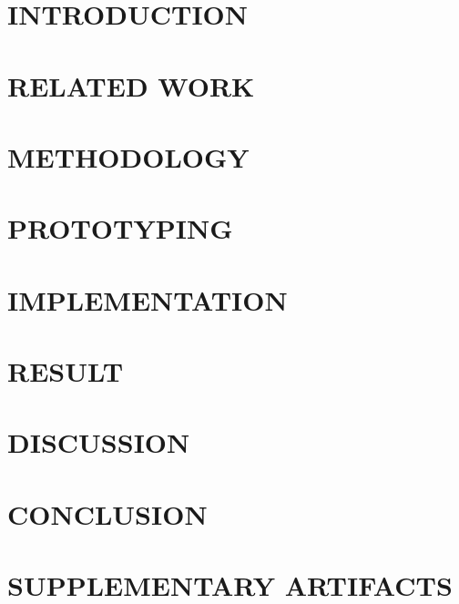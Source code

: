 \documentclass[12pt, twoside]{report}
\makeatletter
\newcommand\AppendixName{Appendix}
\let\oldappendix\appendix
\renewcommand{\appendix}{%
  \oldappendix
  \renewcommand{\chaptername}{\AppendixName}  \renewcommand{\thechapter}{\@Alph\c@chapter}}
\makeatother
\begin{document}
\chapter{INTRODUCTION}
\setcounter{page}{1}


\chapter{RELATED WORK}


\chapter{METHODOLOGY}


\chapter{PROTOTYPING}


\chapter{IMPLEMENTATION}

	
\chapter{RESULT}

	
\chapter{DISCUSSION}

	
\chapter{CONCLUSION}





\appendix
\chapter{SUPPLEMENTARY ARTIFACTS}

\end{document}
